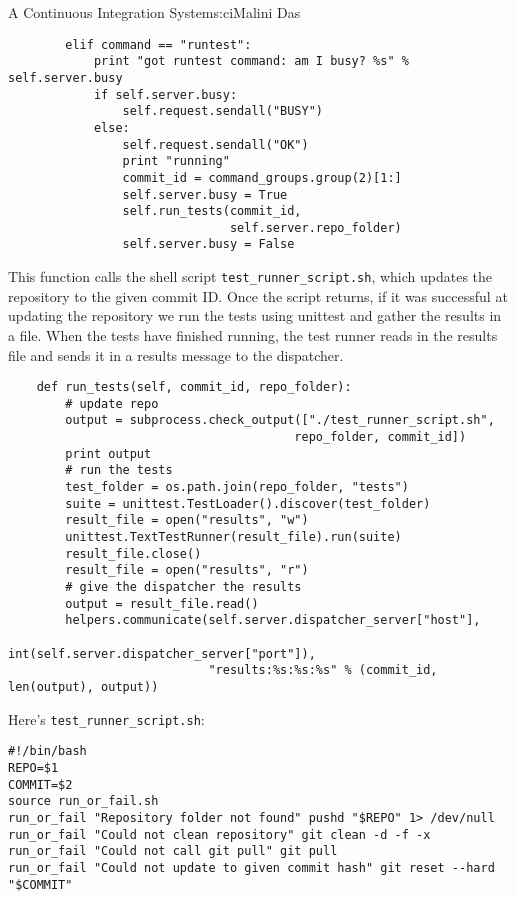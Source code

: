 \begin{aosachapter}{A Continuous Integration System}{s:ci}{Malini Das}
\begin{verbatim}
        elif command == "runtest":
            print "got runtest command: am I busy? %s" % self.server.busy
            if self.server.busy:
                self.request.sendall("BUSY")
            else:
                self.request.sendall("OK")
                print "running"
                commit_id = command_groups.group(2)[1:]
                self.server.busy = True
                self.run_tests(commit_id,
                               self.server.repo_folder)
                self.server.busy = False
\end{verbatim}

This function calls the shell script \texttt{test\_runner\_script.sh},
which updates the repository to the given commit ID. Once the script
returns, if it was successful at updating the repository we run the
tests using unittest and gather the results in a file. When the tests
have finished running, the test runner reads in the results file and
sends it in a results message to the dispatcher.

\begin{verbatim}
    def run_tests(self, commit_id, repo_folder):
        # update repo
        output = subprocess.check_output(["./test_runner_script.sh",
                                        repo_folder, commit_id])
        print output
        # run the tests
        test_folder = os.path.join(repo_folder, "tests")
        suite = unittest.TestLoader().discover(test_folder)
        result_file = open("results", "w")
        unittest.TextTestRunner(result_file).run(suite)
        result_file.close()
        result_file = open("results", "r")
        # give the dispatcher the results
        output = result_file.read()
        helpers.communicate(self.server.dispatcher_server["host"],
                            int(self.server.dispatcher_server["port"]),
                            "results:%s:%s:%s" % (commit_id, len(output), output))
\end{verbatim}

Here's \texttt{test\_runner\_script.sh}:

\begin{verbatim}
#!/bin/bash
REPO=$1
COMMIT=$2
source run_or_fail.sh
run_or_fail "Repository folder not found" pushd "$REPO" 1> /dev/null
run_or_fail "Could not clean repository" git clean -d -f -x
run_or_fail "Could not call git pull" git pull
run_or_fail "Could not update to given commit hash" git reset --hard "$COMMIT"
\end{verbatim}


\end{aosachapter}
